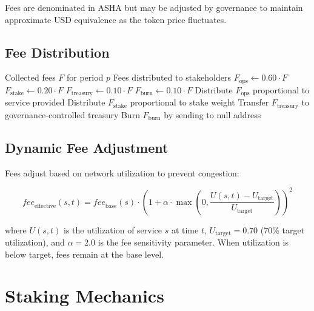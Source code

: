\documentclass[11pt,a4paper]{article}
\newcommand{\asha}{\textsc{ASHA}\xspace}
\begin{document}
Fees are denominated in \asha but may be adjusted by governance to maintain approximate USD equivalence as the token price fluctuates.

\subsection{Fee Distribution}

\begin{algorithm}[H]
\caption{Fee Distribution}
\label{alg:fee-dist}
\begin{algorithmic}[1]
\Require Collected fees $F$ for period $p$
\Ensure Fees distributed to stakeholders
\State $F_{\text{ops}} \leftarrow 0.60 \cdot F$ 
\State $F_{\text{stake}} \leftarrow 0.20 \cdot F$ 
\State $F_{\text{treasury}} \leftarrow 0.10 \cdot F$ 
\State $F_{\text{burn}} \leftarrow 0.10 \cdot F$ 
\State Distribute $F_{\text{ops}}$ proportional to service provided
\State Distribute $F_{\text{stake}}$ proportional to stake weight
\State Transfer $F_{\text{treasury}}$ to governance-controlled treasury
\State Burn $F_{\text{burn}}$ by sending to null address
\end{algorithmic}
\end{algorithm}

\subsection{Dynamic Fee Adjustment}

Fees adjust based on network utilization to prevent congestion:

\begin{equation}
    \mathit{fee}_{\text{effective}}(s, t) = \mathit{fee}_{\text{base}}(s) \cdot \left(1 + \alpha \cdot \max\left(0, \frac{U(s, t) - U_{\text{target}}}{U_{\text{target}}}\right)\right)^2
\end{equation}

where $U(s, t)$ is the utilization of service $s$ at time $t$, $U_{\text{target}} = 0.70$ (70\% target utilization), and $\alpha = 2.0$ is the fee sensitivity parameter. When utilization is below target, fees remain at the base level.

\section{Staking Mechanics}
\end{document}
